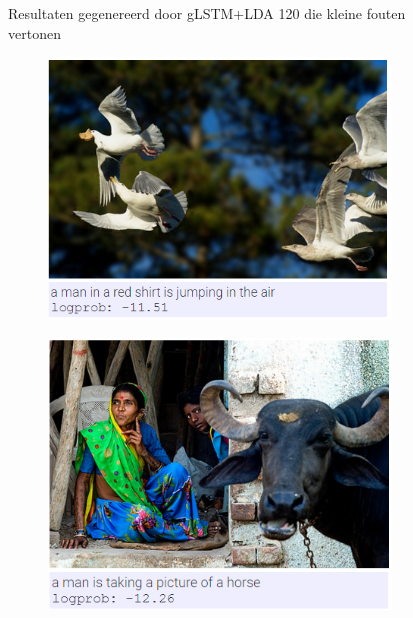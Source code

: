 \begin{figure}
		\caption{Resultaten gegenereerd door gLSTM+LDA 120 die kleine fouten vertonen}
		\label{fig:intermediateresult}
	\end{figure}


	\begin{figure}
		\begin{subfigure}{.5\textwidth}
			\centering
			\includegraphics[width=.8\linewidth]{Images/Results/Bad/birds}
			\label{fig:badresults1}
		\end{subfigure}%
		\begin{subfigure}{.5\textwidth}
			\centering
			\includegraphics[width=.8\linewidth]{Images/Results/Bad/man_taking_picture_of_horse}
			\label{fig:badresults2}
		\end{subfigure}\\
		\begin{subfigure}{.5\textwidth}
			\centering

\end{subfigure}
\end{figure}
